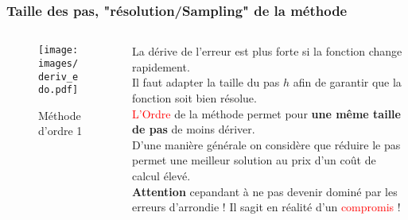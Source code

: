 \documentclass{beamer}
\begin{document}
\begin{frame}
\frametitle{Taille des pas, "résolution/Sampling" de la méthode}
\begin{columns}[t]
\begin{column}{0.3\textwidth}
\begin{figure}
\texttt{[image: images/deriv\_edo.pdf]}
\caption*{Méthode d'ordre 1}
\end{figure}
\end{column}
%
\begin{column}{0.68\textwidth}
La dérive de l'erreur est plus forte si la fonction change rapidement.\\
Il faut adapter la taille du pas $h$ afin de garantir que la fonction soit bien résolue.\\
\vspace{0.4cm}
\textcolor{red}{L'Ordre} de la méthode permet pour \textbf{une même taille de pas} de moins dériver.\\
\vspace{0.3cm}
D'une manière générale on considère que réduire le pas permet une meilleur solution au prix d'un coût de calcul élevé.\\
\vspace{0.3cm}
\textbf{Attention} cepandant à ne pas devenir dominé par les erreurs d'arrondie ! Il sagit en réalité d'un \textcolor{red}{compromis} !
\end{column}
\end{columns}

\end{frame}
\end{document}
